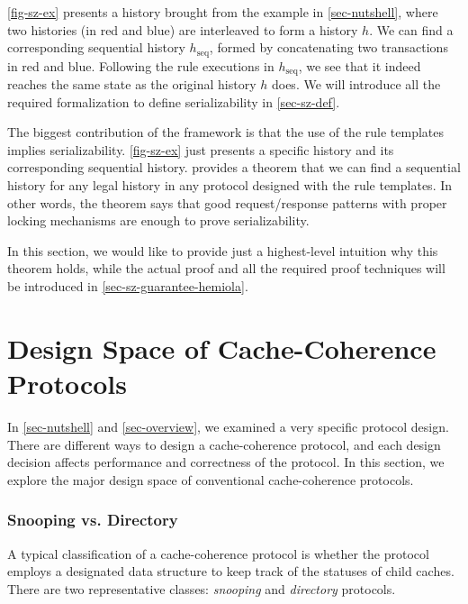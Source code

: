 \autoref{fig-sz-ex} presents a history brought from the example in \autoref{sec-nutshell}, where two histories (in {\color{myred} red} and {\color{myblue} blue}) are interleaved to form a history $h$.
We can find a corresponding sequential history $h_{\textrm{seq}}$, formed by concatenating two transactions in {\color{myred} red} and {\color{myblue} blue}.
Following the rule executions in $h_{\textrm{seq}}$, we see that it indeed reaches the same state as the original history $h$ does.
We will introduce all the required formalization to define serializability in \autoref{sec-sz-def}.

The biggest contribution of the \hemiola{} framework is that the use of the rule templates implies serializability.
\autoref{fig-sz-ex} just presents a specific history and its corresponding sequential history.
\hemiola{} provides a theorem that we can find a sequential history for any legal history in any protocol designed with the rule templates.
In other words, the theorem says that good request/response patterns with proper locking mechanisms are enough to prove serializability.

In this section, we would like to provide just a highest-level intuition why this theorem holds, while the actual proof and all the required proof techniques will be introduced in \autoref{sec-sz-guarantee-hemiola}.


\section{Design Space of Cache-Coherence Protocols}
\label{sec-design-space}

In \autoref{sec-nutshell} and \autoref{sec-overview}, we examined a very specific protocol design.
There are different ways to design a cache-coherence protocol, and each design decision affects performance and correctness of the protocol.
In this section, we explore the major design space of conventional cache-coherence protocols.

\subsubsection{Snooping vs. Directory}

A typical classification of a cache-coherence protocol is whether the protocol employs a designated data structure to keep track of the statuses of child caches.
There are two representative classes: \emph{snooping} and \emph{directory} protocols.

